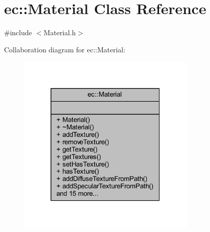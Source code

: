 \hypertarget{classec_1_1_material}{}\section{ec\+:\+:Material Class Reference}
\label{classec_1_1_material}


{\ttfamily \#include $<$Material.\+h$>$}



Collaboration diagram for ec\+:\+:Material\+:\nopagebreak
\begin{figure}[H]
\begin{center}
\leavevmode
\includegraphics[width=241pt]{classec_1_1_material__coll__graph}
\end{center}
\end{figure}
